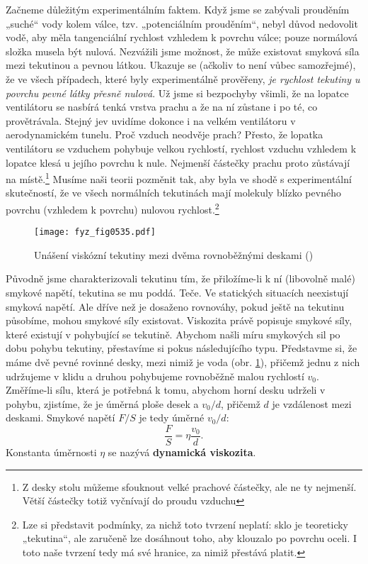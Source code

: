     Začneme důležitým experimentálním faktem. Když jsme se zabývali prouděním „suché“ vody kolem 
    válce, tzv. „potenciálním prouděním“, nebyl důvod nedovolit vodě, aby měla tangenciální 
    rychlost vzhledem k povrchu válce; pouze normálová složka musela být nulová. Nezvážili jsme 
    možnost, že může existovat smyková síla mezi tekutinou a pevnou látkou. Ukazuje se (ačkoliv to 
    není vůbec samozřejmé), že ve všech případech, které byly experimentálně prověřeny, \emph{je 
    rychlost tekutiny u povrchu pevné látky přesně nulová}. Už jsme si bezpochyby všimli, že na 
    lopatce ventilátoru se nasbírá tenká vrstva prachu a že na ní zůstane i po té, co provětrávala. 
    Stejný jev uvidíme dokonce i na velkém ventilátoru v aerodynamickém tunelu. Proč vzduch 
    neodvěje prach? Přesto, že lopatka ventilátoru se vzduchem pohybuje velkou rychlostí, rychlost 
    vzduchu vzhledem k lopatce klesá u jejího povrchu k nule. Nejmenší částečky prachu proto 
    zůstávají na místě.\footnote{Z desky stolu můžeme sfouknout velké prachové částečky, ale ne ty 
    nejmenší. Větší částečky totiž vyčnívají do proudu vzduchu} Musíme naši teorii pozměnit tak, 
    aby byla ve shodě s experimentální skutečností, že ve všech normálních tekutinách mají molekuly 
    blízko pevného povrchu (vzhledem k povrchu) nulovou rychlost.\footnote{Lze si představit 
    podmínky, za nichž toto tvrzení neplatí: sklo je teoreticky „tekutina“, ale zaručeně lze 
    dosáhnout toho, aby klouzalo po povrchu oceli. I toto naše tvrzení tedy má své hranice, za 
    nimiž přestává platit.}
    
    \begin{figure}[ht!] %
      \centering
      \texttt{[image: fyz\_fig0535.pdf]}
      \caption{Unášení viskózní tekutiny mezi dvěma rovnoběžnými deskami
               (\cite[s.~760]{Feynman02})}
      \label{fyz:fig0535}
    \end{figure}
    
    Původně jsme charakterizovali tekutinu tím, že přiložíme-li k ní (libovolně malé) smykové 
    napětí, tekutina se mu poddá. Teče. Ve statických situacích neexistují smyková napětí. 
    Ale dříve než je dosaženo rovnováhy, pokud ještě na tekutinu působíme, mohou smykové síly 
    existovat. Viskozita právě popisuje smykové síly, které existují v pohybující se tekutině. 
    Abychom našli míru smykových sil po dobu pohybu tekutiny, přestavíme si pokus následujícího 
    typu. Představme si, že máme dvě pevné rovinné desky, mezi nimiž je voda (obr. 
    \ref{fyz:fig0535}), přičemž jednu z nich udržujeme v klidu a druhou pohybujeme rovnoběžně malou 
    rychlostí \(v_0\). Změříme-li sílu, která je potřebná k tomu, abychom horní desku udrželi v 
    pohybu, zjistíme, že je úměrná ploše desek a \(v_0/d\), přičemž \(d\) je vzdálenost mezi 
    deskami. Smykové napětí \(F/S\) je tedy úměrné \(v_0/d\):
    \begin{equation*}
      \dfrac{F}{S} = \eta\dfrac{v_0}{d}.
    \end{equation*}
    Konstanta úměrnosti \(\eta\) se nazývá \textbf{dynamická viskozita}. 
    
